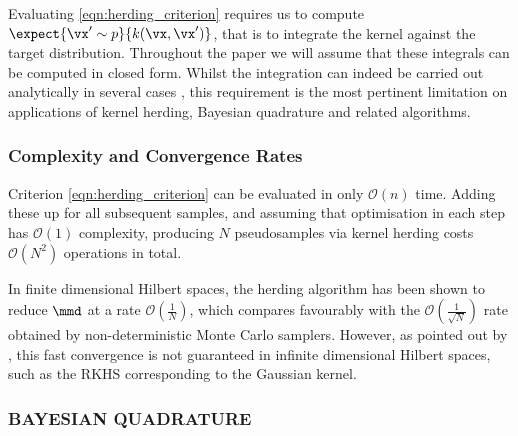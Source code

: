 Evaluating \eqref{eqn:herding_criterion} requires us to compute $\expect{\vx' \sim p}{k(\vx, \vx')} $, that is to integrate the kernel against the target distribution. Throughout the paper we will assume that these integrals can be computed in closed form. Whilst the integration can indeed be carried out analytically in several cases \citep{Song2008,chen2010super}, this requirement is the most pertinent limitation on applications of kernel herding, Bayesian quadrature and related algorithms.

\subsubsection{Complexity and Convergence Rates}

Criterion \eqref{eqn:herding_criterion} can be evaluated in only $\mathcal{O}(n)$ time. Adding these up for all subsequent samples, and assuming that optimisation in each step has $\mathcal{O}(1)$ complexity, producing $N$ pseudosamples via kernel herding costs $\mathcal{O}(N^2)$ operations in total.

In finite dimensional Hilbert spaces, the herding algorithm has been shown to reduce $\mmd$ at a rate $\mathcal{O}(\frac{1}{N})$, which compares favourably with the $\mathcal{O}(\frac{1}{\sqrt{N}})$ rate obtained by non-deterministic Monte Carlo samplers. However, as pointed out by \cite{bach2012equivalence}, this fast convergence is not guaranteed in infinite dimensional Hilbert spaces, such as the RKHS corresponding to the Gaussian kernel.




\subsubsection{BAYESIAN QUADRATURE} 

